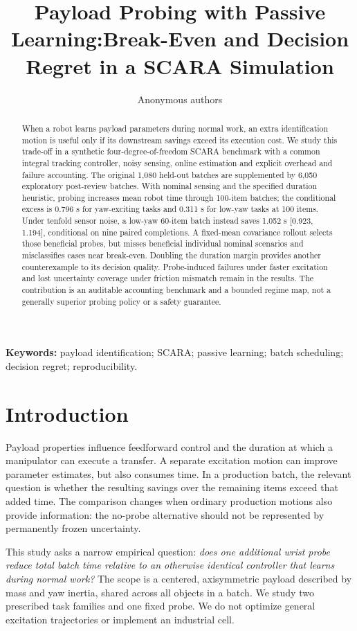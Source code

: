 \documentclass[10pt,twocolumn]{article}
\title{\vspace{-1.3em}\LARGE\bfseries Payload Probing with Passive Learning:\newline Break-Even and Decision Regret in a SCARA Simulation}
\author{Anonymous authors}
\date{}
\begin{document}
\maketitle\thispagestyle{fancy}
\begin{abstract}
When a robot learns payload parameters during normal work, an extra identification motion is useful only if its downstream savings exceed its execution cost. We study this trade-off in a synthetic four-degree-of-freedom SCARA benchmark with a common integral tracking controller, noisy sensing, online estimation and explicit overhead and failure accounting. The original 1,080 held-out batches are supplemented by 6,050 exploratory post-review batches. With nominal sensing and the specified duration heuristic, probing increases mean robot time through 100-item batches; the conditional excess is 0.796 s for yaw-exciting tasks and 0.311 s for low-yaw tasks at 100 items. Under tenfold sensor noise, a low-yaw 60-item batch instead saves 1.052 s [0.923, 1.194], conditional on nine paired completions. A fixed-mean covariance rollout selects those beneficial probes, but misses beneficial individual nominal scenarios and misclassifies cases near break-even. Doubling the duration margin provides another counterexample to its decision quality. Probe-induced failures under faster excitation and lost uncertainty coverage under friction mismatch remain in the results. The contribution is an auditable accounting benchmark and a bounded regime map, not a generally superior probing policy or a safety guarantee.
\end{abstract}
\noindent\textbf{Keywords:} payload identification; SCARA; passive learning; batch scheduling; decision regret; reproducibility.

\section{Introduction}
Payload properties influence feedforward control and the duration at which a manipulator can execute a transfer. A separate excitation motion can improve parameter estimates, but also consumes time. In a production batch, the relevant question is whether the resulting savings over the remaining items exceed that added time. The comparison changes when ordinary production motions also provide information: the no-probe alternative should not be represented by permanently frozen uncertainty.

This study asks a narrow empirical question: \emph{does one additional wrist probe reduce total batch time relative to an otherwise identical controller that learns during normal work?} The scope is a centered, axisymmetric payload described by mass and yaw inertia, shared across all objects in a batch. We study two prescribed task families and one fixed probe. We do not optimize general excitation trajectories or implement an industrial cell.
\end{document}
